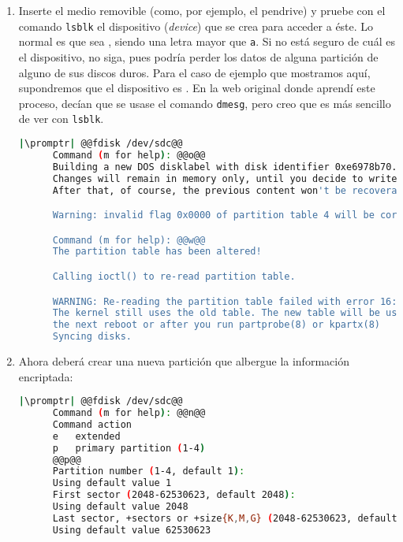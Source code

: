 \begin{enumerate}

  \item Inserte el medio removible (como, por ejemplo, el pendrive) y pruebe con el comando \lstinline+lsblk+ el
    dispositivo (\foreignlanguage{english}{\textit{device}}) que se crea para acceder a éste. Lo normal es que
    sea , siendo  una letra mayor que \texttt{a}. Si no está seguro de cuál es el
    dispositivo, no siga, pues podría perder los datos de alguna partición de alguno de sus discos duros. Para
    el caso de ejemplo que mostramos aquí, supondremos que el dispositivo es . En la web original
    donde aprendí este proceso, decían que se usase el comando \lstinline+dmesg+, pero creo que es más sencillo
    de ver con \lstinline+lsblk+.

    \begin{lstlisting}[gobble=6,language=bash,style=bashinteract,escapechar=|]
      |\promptr| @@fdisk /dev/sdc@@
      Command (m for help): @@o@@
      Building a new DOS disklabel with disk identifier 0xe6978b70.
      Changes will remain in memory only, until you decide to write them.
      After that, of course, the previous content won't be recoverable.

      Warning: invalid flag 0x0000 of partition table 4 will be corrected by w(rite)

      Command (m for help): @@w@@
      The partition table has been altered!

      Calling ioctl() to re-read partition table.

      WARNING: Re-reading the partition table failed with error 16: Device or resource busy.
      The kernel still uses the old table. The new table will be used at
      the next reboot or after you run partprobe(8) or kpartx(8)
      Syncing disks.
    \end{lstlisting}

  \item Ahora deberá crear una nueva partición que albergue la información encriptada:

    \begin{lstlisting}[gobble=6,language=bash,style=bashinteract,escapechar=|]
      |\promptr| @@fdisk /dev/sdc@@
      Command (m for help): @@n@@
      Command action
      e   extended
      p   primary partition (1-4)
      @@p@@
      Partition number (1-4, default 1):
      Using default value 1
      First sector (2048-62530623, default 2048):
      Using default value 2048
      Last sector, +sectors or +size{K,M,G} (2048-62530623, default 62530623):
      Using default value 62530623


\end{lstlisting}
\end{enumerate}
